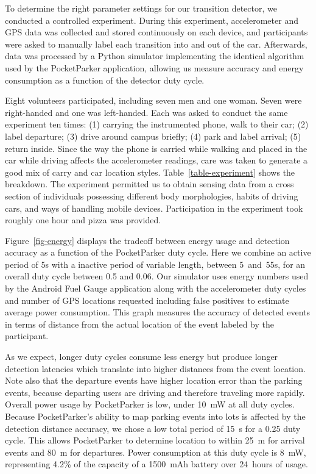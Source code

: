 

To determine the right parameter settings for our transition detector, we
conducted a controlled experiment. During this experiment, accelerometer and
GPS data was collected and stored continuously on each device, and
participants were asked to manually label each transition into and out of the
car. Afterwards, data was processed by a Python simulator implementing the
identical algorithm used by the PocketParker application, allowing us measure
accuracy and energy consumption as a function of the detector duty cycle.

Eight volunteers participated, including seven men and one woman. Seven were
right-handed and one was left-handed. Each was asked to conduct the same
experiment ten times: (1) carrying the instrumented phone, walk to their car;
(2) label departure; (3) drive around campus briefly; (4) park and label
arrival; (5) return inside. Since the way the phone is carried while walking
and placed in the car while driving affects the accelerometer readings, care
was taken to generate a good mix of carry and car location styles.
Table~\ref{table-experiment} shows the breakdown. The experiment permitted us
to obtain sensing data from a cross section of individuals possessing
different body morphologies, habits of driving cars, and ways of handling
mobile devices. Participation in the experiment took roughly one hour and
pizza was provided.

Figure~\ref{fig-energy} displays the tradeoff between energy usage and
detection accuracy as a function of the PocketParker duty cycle. Here we
combine an active period of 5s with a inactive period of variable length,
between 5~and~55s, for an overall duty cycle between 0.5 and 0.06. Our
simulator uses energy numbers used by the Android Fuel Gauge application
along with the accelerometer duty cycles and number of GPS locations
requested including false positives to estimate average power consumption.
This graph measures the accuracy of detected events in terms of distance from
the actual location of the event labeled by the participant.

As we expect, longer duty cycles consume less energy but produce longer
detection latencies which translate into higher distances from the event
location. Note also that the departure events have higher location error than
the parking events, because departing users are driving and therefore
traveling more rapidly. Overall power usage by PocketParker is low, under
10~mW at all duty cycles. Because PocketParker's ability to map parking
events into lots is affected by the detection distance accuracy, we chose a
low total period of 15~s for a 0.25 duty cycle. This allows PocketParker to
determine location to within 25~m for arrival events and 80~m for departures.
Power consumption at this duty cycle is 8~mW, representing 4.2\% of the
capacity of a 1500~mAh battery over 24~hours of usage.

